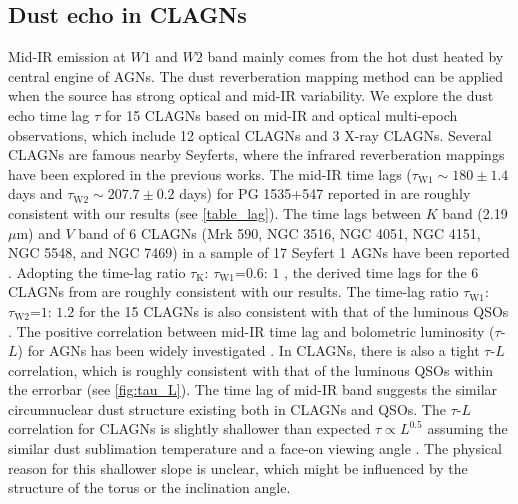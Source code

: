 \documentclass[linenumbers]{aastex631}
\begin{document}
\subsection{Dust echo in CLAGNs}
Mid-IR emission at $W1$ and $W2$ band mainly comes from the hot dust heated by central engine of AGNs. The dust reverberation mapping method can be applied when the source has strong optical and mid-IR variability. We explore the dust echo time lag $\tau$ for 15 CLAGNs based on mid-IR and optical multi-epoch observations, which include 12 optical CLAGNs and 3 X-ray CLAGNs. Several CLAGNs are famous nearby Seyferts, where the infrared reverberation mappings have been explored in the previous works. The mid-IR time lags ($\tau_{\mathrm{W1}} \sim 180\pm 1.4$ days and $\tau_{\mathrm{W2}}\sim 207.7\pm 0.2$ days) for PG 1535+547 reported in \citet{2019ApJ...886...33L} are roughly consistent with our results (see \autoref{table_lag}). The time lags between $K$ band (2.19 $\mu$m) and $V$ band of 6 CLAGNs (Mrk 590, NGC 3516, NGC 4051, NGC 4151, NGC 5548, and NGC 7469) in a sample of 17 Seyfert 1 AGNs have been reported \citep[see][]{2014ApJ...788..159K,2019ApJ...886...33L}. Adopting the time-lag ratio $\tau_{\mathrm{K}}$: $\tau_{\mathrm{W1}}$=$0.6$: $1$ \citep[see][]{2019ApJ...886...33L}, the derived time lags for the 6 CLAGNs from \citet[]{2014ApJ...788..159K} are roughly consistent with our results. The time-lag ratio $\tau_{\mathrm{W1}}$: $\tau_{\mathrm{W2}}$=$1$: $1.2$ for the 15 CLAGNs is also consistent with that of the luminous QSOs \citep[see][]{2019ApJ...886...33L}. The positive correlation between mid-IR time lag and bolometric luminosity ($\tau$-$L$) for AGNs has been widely investigated \citep[e.g.,][]{2014ApJ...788..159K,2019ApJ...886...33L,2019ApJ...886..150M,2020MNRAS.495.2921N,2020AJ....159..259S,2021MNRAS.501.3905M}. In CLAGNs, there is also a tight $\tau$-$L$ correlation, which is roughly consistent with that of the luminous QSOs \citep{2019ApJ...886...33L} within the errorbar (see \autoref{fig:tau_L}). The time lag of mid-IR band suggests the similar circumnuclear dust structure existing both in CLAGNs and QSOs. The $\tau$-$L$ correlation for CLAGNs is slightly shallower than expected $\tau \propto L^{0.5}$ assuming the similar dust sublimation temperature \citep{2013peag.book.....N} and a face-on viewing angle \citep{2019ApJ...886...33L}. The physical reason for this shallower slope is unclear, which might be influenced by the structure of the torus or the inclination angle.  
\end{document}

